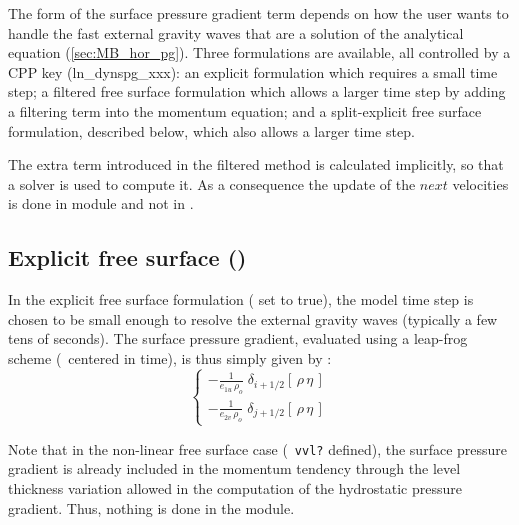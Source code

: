 \documentclass[../main/NEMO_manual]{subfiles}
\begin{document}
The form of the surface pressure gradient term depends on how the user wants to
handle the fast external gravity waves that are a solution of the analytical equation (\autoref{sec:MB_hor_pg}).
Three formulations are available, all controlled by a CPP key (ln\_dynspg\_xxx):
an explicit formulation which requires a small time step;
a filtered free surface formulation which allows a larger time step by
adding a filtering term into the momentum equation;
and a split-explicit free surface formulation, described below, which also allows a larger time step.

The extra term introduced in the filtered method is calculated implicitly, so that a solver is used to compute it.
As a consequence the update of the $next$ velocities is done in module  and not in .

\subsection[Explicit free surface (\forcode{ln_dynspg_exp})]{Explicit free surface (\protect{})}
\label{subsec:DYN_spg_exp}

In the explicit free surface formulation ( set to true),
the model time step is chosen to be small enough to resolve the external gravity waves
(typically a few tens of seconds).
The surface pressure gradient, evaluated using a leap-frog scheme (\ie\ centered in time),
is thus simply given by :
\begin{equation}
  \label{eq:DYN_spg_exp}
  \left\{
    \begin{aligned}
      - \frac{1}{e_{1u}\,\rho_o} \;	\delta_{i+1/2} \left[  \,\rho \,\eta\,  \right] 	\\
      - \frac{1}{e_{2v}\,\rho_o} \;	\delta_{j+1/2} \left[  \,\rho \,\eta\,  \right]
    \end{aligned}
  \right.
\end{equation}

Note that in the non-linear free surface case (\ie\ \texttt{vvl?} defined),
the surface pressure gradient is already included in the momentum tendency through
the level thickness variation allowed in the computation of the hydrostatic pressure gradient.
Thus, nothing is done in the  module.

\end{document}
